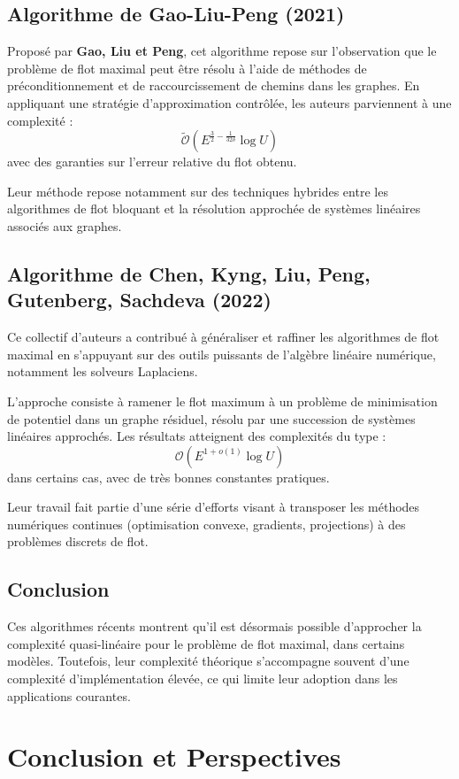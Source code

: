\documentclass[a4paper]{article}
\begin{document}
\subsection{Algorithme de Gao-Liu-Peng (2021)}

Proposé par \textbf{Gao, Liu et Peng}, cet algorithme repose sur l’observation que le problème de flot maximal peut être résolu à l’aide de méthodes de préconditionnement et de raccourcissement de chemins dans les graphes\cite{gao2021fullydynamicelectricalflows}. En appliquant une stratégie d’approximation contrôlée, les auteurs parviennent à une complexité :
\[
\tilde{\mathcal{O}}\left(E^{\frac{3}{2} - \frac{1}{32\delta}} \log U\right)
\]
avec des garanties sur l’erreur relative du flot obtenu.

Leur méthode repose notamment sur des techniques hybrides entre les algorithmes de flot bloquant et la résolution approchée de systèmes linéaires associés aux graphes.

\subsection{Algorithme de Chen, Kyng, Liu, Peng, Gutenberg, Sachdeva (2022)}

Ce collectif d’auteurs a contribué à généraliser et raffiner les algorithmes de flot maximal en s’appuyant sur des outils puissants de l’algèbre linéaire numérique, notamment les solveurs Laplaciens.

L’approche consiste à ramener le flot maximum à un problème de minimisation de potentiel dans un graphe résiduel, résolu par une succession de systèmes linéaires approchés\cite{chen2022maximumflowminimumcostflow}. Les résultats atteignent des complexités du type :
\[
\mathcal{O}\left(E^{1 + o(1)} \log U\right)
\]
dans certains cas, avec de très bonnes constantes pratiques.

Leur travail fait partie d’une série d’efforts visant à transposer les méthodes numériques continues (optimisation convexe, gradients, projections) à des problèmes discrets de flot.

\subsection{Conclusion}

Ces algorithmes récents montrent qu’il est désormais possible d’approcher la complexité quasi-linéaire pour le problème de flot maximal, dans certains modèles. Toutefois, leur complexité théorique s’accompagne souvent d’une complexité d’implémentation élevée, ce qui limite leur adoption dans les applications courantes.

\section{Conclusion et Perspectives}
\printbibliography[heading=bibintoc]
\end{document}
